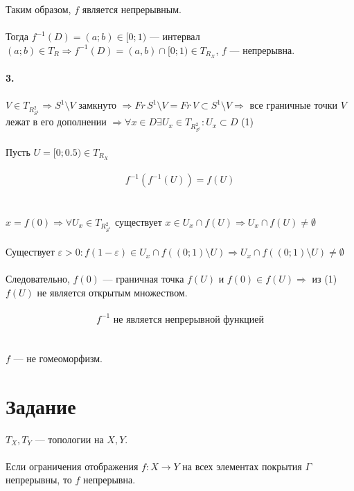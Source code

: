 \documentclass{article}
\begin{document}
        Таким образом, \( f \) является непрерывным. \\ \\
        Тогда \( f^{-1}(D) = (a; b) \in [0; 1) \) — интервал
        \((a; b) \in T_R \Rightarrow f^{-1}(D) = (a, b) \cap [0; 1) \in T_{R_X}\),
        \( f \) — непрерывна.\\ \\
        \textbf{3.}\\ \\
        \( V \in T_{R^2_{S^1}} \Rightarrow S^1 \setminus V \) замкнуто 
        \( \Rightarrow Fr \, S^1 \setminus V = Fr \, V \subset S^1 \setminus V \Rightarrow \) все граничные точки \( V \) лежат в его дополнении \(\Rightarrow \forall x \in D \exists U_x \in T_{R^2_{S^1}} : U_x \subset D \) \qquad (1) \\ \\
        Пусть \( U = [0; 0.5) \in T_{R_X} \)\\ \\
        \[ f^{-1}(f^{-1}(U)) = f(U) \]\\ \\
        \( x = f(0) \Rightarrow \forall U_x \in T_{R^2_{S^1}} \) существует \( x \in U_x \cap f(U) \Rightarrow U_x \cap f(U) \neq \emptyset \)\\ \\
        Существует \( \varepsilon > 0 : f(1 - \varepsilon) \in U_x \cap f((0; 1) \setminus U) \Rightarrow U_x \cap f((0; 1) \setminus U) \neq \emptyset \)\\ \\
        Следовательно, \( f(0) \) — граничная точка \( f(U) \) и \( f(0) \in f(U) \Rightarrow \) из (1) \( f(U) \) не является открытым множеством.\\ \\
        \[
        f^{-1} \text{ не является непрерывной функцией}
        \]\\ \\
        \( f \) — не гомеоморфизм.
        
    
        \section{Задание}
        \( T_X, T_Y \) — топологии на \( X, Y \).\\ \\
        Если ограничения отображения \( f : X \rightarrow Y \) на всех элементах покрытия \( \Gamma \) непрерывны, то \( f \) непрерывна.
        
\end{document}
